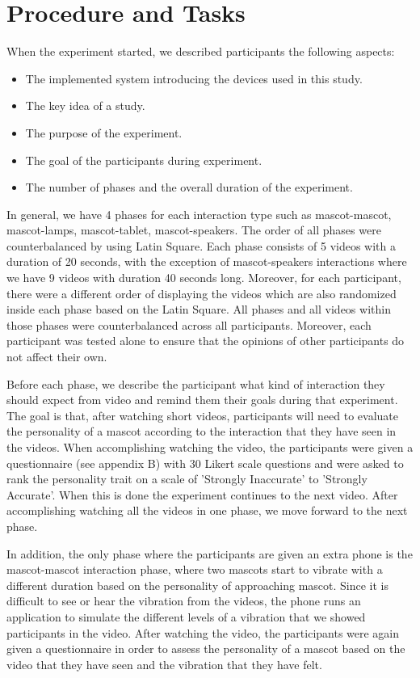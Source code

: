 \section{Procedure and Tasks}
\label{sec:procedure-and-tasks}
When the experiment started, we described participants the following aspects:
\begin{itemize}
  \item The implemented system introducing the devices used in this study.
  \item The key idea of a study.
  \item The purpose of the experiment.
  \item The goal of the participants during experiment.
  \item The number of phases and the overall duration of the experiment.
\end{itemize}


In general, we have 4 phases for each interaction type such as mascot-mascot,
mascot-lamps, mascot-tablet, mascot-speakers.
The order of all phases were counterbalanced by using Latin Square.
Each phase consists of 5 videos with a duration of 20 seconds, with the exception of
mascot-speakers interactions where we have 9 videos with duration 40 seconds long.
Moreover, for each participant, there were a different order of displaying the videos
which are also randomized inside each phase based on the Latin Square.
All phases and all videos within those phases were counterbalanced across all participants.
Moreover, each participant was tested alone to ensure that the opinions of other participants do not affect their own.

Before each phase, we describe the participant what kind of interaction they should
expect from video and remind them their goals during that experiment.
The goal is that, after watching short videos, participants will need to evaluate the personality
of a mascot according to the interaction that they have seen in the videos.
When accomplishing watching the video, the participants were given a questionnaire
(see appendix B) with 30 Likert scale questions and were asked to rank the personality trait
on a scale of 'Strongly Inaccurate' to 'Strongly Accurate'.
When this is done the experiment continues to the next video.
After accomplishing watching all the videos in one phase, we move forward to the next phase.

In addition, the only phase where the participants are given an extra phone
is the mascot-mascot interaction phase, where two mascots start to vibrate
with a different duration based on the personality of approaching mascot.
Since it is difficult to see or hear the vibration from the videos, the phone runs an
application to simulate the different levels of a vibration that we showed participants in the video.
After watching the video, the participants were again given a questionnaire in order to assess
the personality of a mascot based on the video that they have seen and the vibration that they have felt.


